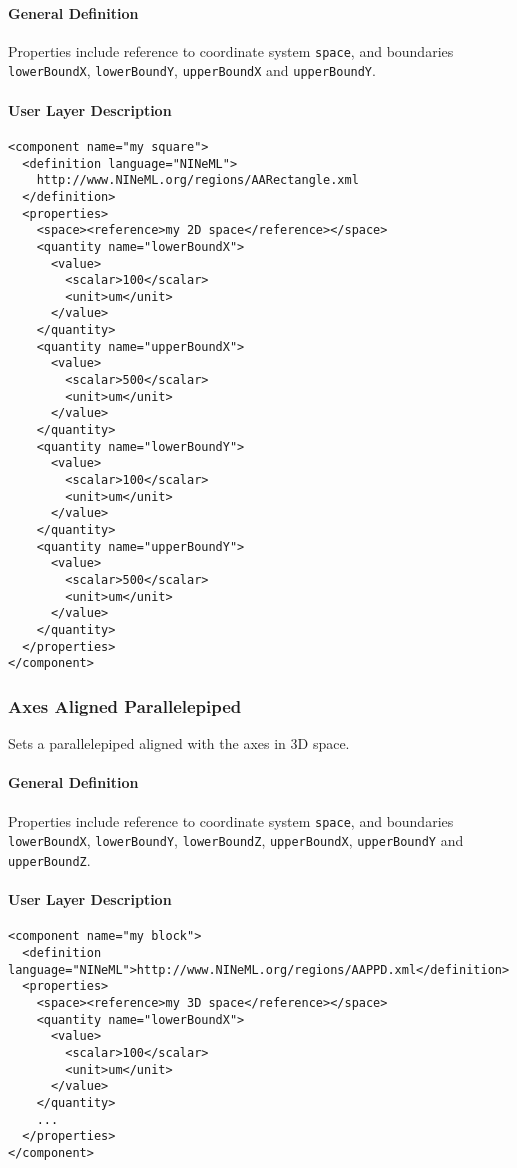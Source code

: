 \documentclass{article}
\begin{document}
\paragraph{General Definition}
Properties include reference to coordinate system {\tt space}, and boundaries
{\tt lowerBoundX}, {\tt lowerBoundY}, {\tt upperBoundX} and {\tt upperBoundY}.

\paragraph{User Layer Description}
\begin{verbatim}
<component name="my square">
  <definition language="NINeML">
    http://www.NINeML.org/regions/AARectangle.xml
  </definition>
  <properties>
    <space><reference>my 2D space</reference></space>
    <quantity name="lowerBoundX">
      <value>
        <scalar>100</scalar>
        <unit>um</unit>
      </value>
    </quantity>
    <quantity name="upperBoundX">
      <value>
        <scalar>500</scalar>
        <unit>um</unit>
      </value>
    </quantity>
    <quantity name="lowerBoundY">
      <value>
        <scalar>100</scalar>
        <unit>um</unit>
      </value>
    </quantity>
    <quantity name="upperBoundY">
      <value>
        <scalar>500</scalar>
        <unit>um</unit>
      </value>
    </quantity>
  </properties>
</component>
\end{verbatim}

\subsubsection{Axes Aligned Parallelepiped}

Sets a parallelepiped aligned with the axes in 3D space.

\paragraph{General Definition}
Properties include reference to coordinate system {\tt space}, and boundaries
{\tt lowerBoundX}, {\tt lowerBoundY}, {\tt lowerBoundZ}, {\tt upperBoundX},
{\tt upperBoundY}  and {\tt upperBoundZ}.

\paragraph{User Layer Description}
\begin{verbatim}
<component name="my block">
  <definition language="NINeML">http://www.NINeML.org/regions/AAPPD.xml</definition>
  <properties>
    <space><reference>my 3D space</reference></space>
    <quantity name="lowerBoundX">
      <value>
        <scalar>100</scalar>
        <unit>um</unit>
      </value>
    </quantity>
    ...
  </properties>
</component>
\end{verbatim}
\end{document}
